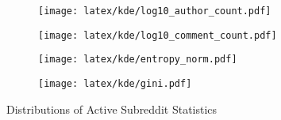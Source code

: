 \begin{figure}
    \centering
    \begin{subfigure}[b]{0.49\textwidth}
        \centering
        \texttt{[image: latex/kde/log10\_author\_count.pdf]}
        \label{hist/author}
    \end{subfigure}
    \hfill
    \begin{subfigure}[b]{0.49\textwidth}
        \centering
        \texttt{[image: latex/kde/log10\_comment\_count.pdf]}
        \label{hist/comment}
    \end{subfigure}
    \hfill
    \begin{subfigure}[b]{0.49\textwidth}
        \centering
        \texttt{[image: latex/kde/entropy\_norm.pdf]}
        \label{hist/entropy}
    \end{subfigure}
    \hfill
    \begin{subfigure}[b]{0.49\textwidth}
        \centering
        \texttt{[image: latex/kde/gini.pdf]}
        \label{hist/gini}
    \end{subfigure}
       \caption{Distributions of Active Subreddit Statistics}
       \label{hists/active}
\end{figure}
